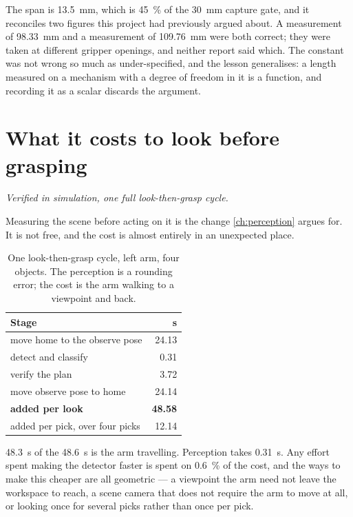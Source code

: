 The span is \SI{13.5}{\milli\metre}, which is \SI{45}{\percent} of the
\SI{30}{\milli\metre} capture gate, and it reconciles two figures this project
had previously argued about. A measurement of \SI{98.33}{\milli\metre} and a
measurement of \SI{109.76}{\milli\metre} were both correct; they were taken at
different gripper openings, and neither report said which. The constant was
not wrong so much as under-specified, and the lesson generalises: a length
measured on a mechanism with a degree of freedom in it is a function, and
recording it as a scalar discards the argument.

\section{What it costs to look before grasping}
\label{sec:look-cost}

\emph{Verified in simulation, one full look-then-grasp cycle.}

Measuring the scene before acting on it is the change
\cref{ch:perception} argues for. It is not free, and the cost is almost
entirely in an unexpected place.

\begin{table}[htbp]
  \centering
  \small
  \caption[The cost of one look]{One look-then-grasp cycle, left arm, four
  objects. The perception is a rounding error; the cost is the arm walking to
  a viewpoint and back.}
  \label{tab:look-cost}
  \begin{tabular}{@{}lr@{}}
    \toprule
    Stage & \si{\second} \\
    \midrule
    move home to the observe pose & \num{24.13} \\
    detect and classify & \num{0.31} \\
    verify the plan & \num{3.72} \\
    move observe pose to home & \num{24.14} \\
    \midrule
    \textbf{added per look} & \textbf{\num{48.58}} \\
    added per pick, over four picks & \num{12.14} \\
    \bottomrule
  \end{tabular}
\end{table}

\SI{48.3}{\second} of the \SI{48.6}{\second} is the arm travelling.
Perception takes \SI{0.31}{\second}. Any effort spent making the detector
faster is spent on \SI{0.6}{\percent} of the cost, and the ways to make this
cheaper are all geometric --- a viewpoint the arm need not leave the workspace
to reach, a scene camera that does not require the arm to move at all, or
looking once for several picks rather than once per pick.

